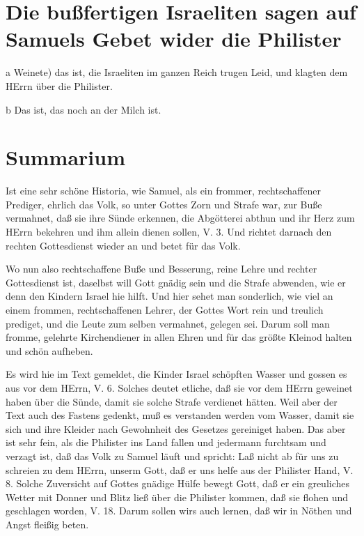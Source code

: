 \section[Die bußfertigen Israeliten sagen auf Samuels Gebet wider]{Die bußfertigen Israeliten sagen auf Samuels Gebet wider die Philister}

a Weinete) das ist, die Israeliten im ganzen Reich trugen Leid, und klagten dem HErrn über die Philister.

b Das ist, das noch an der Milch ist.

\section{Summarium}

Ist eine sehr schöne Historia, wie Samuel, als ein frommer, rechtschaffener Prediger, ehrlich das Volk, so unter Gottes Zorn und Strafe war, zur Buße vermahnet, daß sie ihre Sünde erkennen, die Abgötterei abthun und ihr Herz zum HErrn bekehren und ihm allein dienen sollen, V. 3. Und richtet darnach den rechten Gottesdienst wieder an und betet für das Volk.

Wo nun also rechtschaffene Buße und Besserung, reine Lehre und rechter Gottesdienst ist, daselbst will Gott gnädig sein und die Strafe abwenden, wie er denn den Kindern Israel hie hilft. Und hier sehet man sonderlich, wie viel an einem frommen, rechtschaffenen Lehrer, der Gottes Wort rein und treulich prediget, und die Leute zum selben vermahnet, gelegen sei. Darum soll man fromme, gelehrte Kirchendiener in allen Ehren und für das größte Kleinod halten und schön aufheben.

Es wird hie im Text gemeldet, die Kinder Israel schöpften Wasser und gossen es aus vor dem HErrn, V. 6. Solches deutet etliche, daß sie vor dem HErrn geweinet haben über die Sünde, damit sie solche Strafe verdienet hätten. Weil aber der Text auch des Fastens gedenkt, muß es verstanden werden vom Wasser, damit
sie sich und ihre Kleider nach Gewohnheit des Gesetzes gereiniget haben. Das aber ist sehr fein, als die Philister ins Land fallen und jedermann furchtsam und verzagt ist, daß das Volk zu Samuel läuft und spricht: Laß nicht ab für uns zu schreien zu dem HErrn, unserm Gott, daß er uns helfe aus der Philister Hand, V. 8. Solche Zuversicht auf Gottes gnädige Hülfe bewegt Gott, daß er ein greuliches Wetter mit Donner und Blitz ließ über die Philister kommen, daß sie flohen und geschlagen worden, V. 18. Darum sollen wirs auch lernen, daß wir in Nöthen und Angst fleißig beten.

